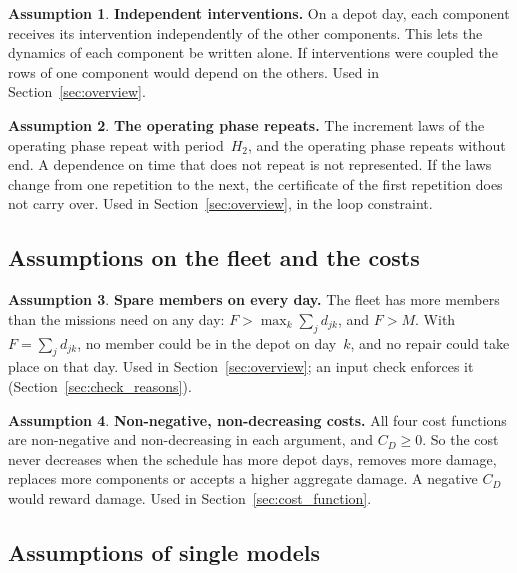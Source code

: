 \documentclass[11pt,a4paper]{article}
\theoremstyle{plain}
\theoremstyle{definition}
\newtheorem{assumption}{Assumption}
\theoremstyle{remark}
\begin{document}
\begin{assumption}\label{as:independent_interventions}
\textbf{Independent interventions.}
On a depot day, each component receives its intervention independently of the other components.
This lets the dynamics of each component be written alone.
If interventions were coupled the rows of one component would depend on the others.
Used in Section~\ref{sec:overview}.
\end{assumption}

\begin{assumption}\label{as:repetition}
\textbf{The operating phase repeats.}
The increment laws of the operating phase repeat with period~$H_2$, and the operating phase repeats without end.
A dependence on time that does not repeat is not represented.
If the laws change from one repetition to the next, the certificate of the first repetition does not carry over.
Used in Section~\ref{sec:overview}, in the loop constraint.
\end{assumption}

\subsection{Assumptions on the fleet and the costs}

\begin{assumption}\label{as:free_members}
\textbf{Spare members on every day.}
The fleet has more members than the missions need on any day: $F > \max_k \sum_j d_{jk}$, and $F > M$.
With $F = \sum_j d_{jk}$, no member could be in the depot on day~$k$, and no repair could take place on that day.
Used in Section~\ref{sec:overview}; an input check enforces it (Section~\ref{sec:check_reasons}).
\end{assumption}

\begin{assumption}\label{as:costs}
\textbf{Non-negative, non-decreasing costs.}
All four cost functions are non-negative and non-decreasing in each argument, and $C_D \ge 0$.
So the cost never decreases when the schedule has more depot days, removes more damage, replaces more components or accepts a higher aggregate damage.
A negative $C_D$ would reward damage.
Used in Section~\ref{sec:cost_function}.
\end{assumption}

\subsection{Assumptions of single models}
\end{document}
